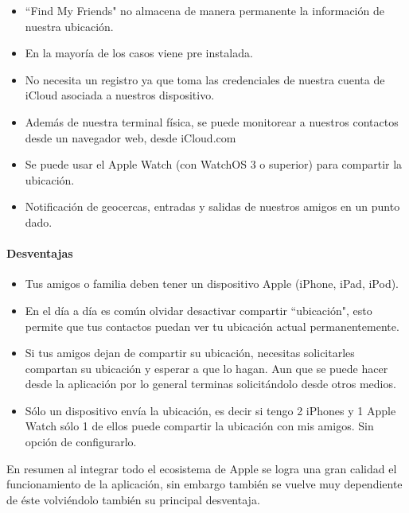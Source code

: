 \begin{itemize}
    \item ``Find My Friends" no almacena de manera permanente la información de nuestra ubicación.
    \item En la mayoría de los casos viene pre instalada.
    \item No necesita un registro ya que toma las credenciales de nuestra cuenta de iCloud asociada a nuestros dispositivo.
    \item Además de nuestra terminal física, se puede monitorear a nuestros contactos desde un navegador web, desde iCloud.com
    \item Se puede usar el Apple Watch (con WatchOS 3 o superior) para compartir la ubicación.
    \item Notificación de geocercas, entradas y salidas de nuestros amigos en un punto dado.
\end{itemize}

\paragraph{Desventajas}

\begin{itemize}
\item Tus amigos o familia deben tener un dispositivo Apple (iPhone, iPad, iPod).
\item En el día a día es común olvidar desactivar compartir ``ubicación", esto permite que tus contactos puedan ver tu ubicación actual permanentemente.
\item Si tus amigos dejan de compartir su ubicación, necesitas solicitarles compartan su ubicación y esperar a que lo hagan. Aun que se puede hacer desde la aplicación por lo general terminas solicitándolo desde otros medios.
\item Sólo un dispositivo envía la ubicación, es decir si tengo 2 iPhones y 1 Apple Watch sólo 1 de ellos puede compartir la ubicación con mis amigos. Sin opción de configurarlo.
\end{itemize}

En resumen al integrar todo el ecosistema de Apple se logra una gran calidad el funcionamiento de la aplicación, sin embargo también se vuelve muy dependiente de éste volviéndolo también su principal desventaja.